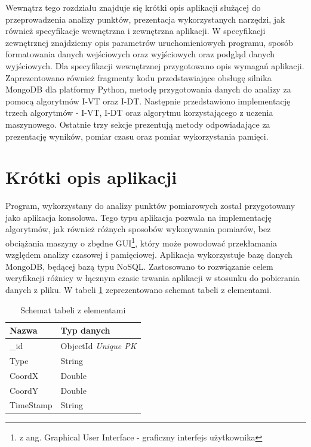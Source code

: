 Wewnątrz tego rozdziału znajduje się krótki opis aplikacji służącej do przeprowadzenia analizy punktów, prezentacja wykorzystanych narzędzi, jak również specyfikacje wewnętrzna i zewnętrzna aplikacji. W specyfikacji zewnętrznej znajdziemy opis parametrów uruchomieniowych programu, sposób formatowania danych wejściowych oraz wyjściowych oraz podgląd danych wyjściowych. Dla specyfikacji wewnętrznej przygotowano opis wymagań aplikacji. Zaprezentowano również fragmenty kodu przedstawiające obsługę silnika MongoDB dla platformy Python, metodę przygotowania danych do analizy za pomocą algorytmów I-VT oraz I-DT. Następnie przedstawiono implementację trzech algorytmów - I-VT, I-DT oraz algorytmu korzystającego z uczenia maszynowego. Ostatnie trzy sekcje prezentują metody odpowiadające za prezentację wyników, pomiar czasu oraz pomiar wykorzystania pamięci. 
\section{Krótki opis aplikacji}
\label{sec:shortdesc}
Program, wykorzystany do analizy punktów pomiarowych został przygotowany jako aplikacja konsolowa. Tego typu aplikacja pozwala na implementację algorytmów, jak również różnych sposobów wykonywania pomiarów, bez obciążania maszyny o zbędne GUI\footnote{z ang. Graphical User Interface - graficzny interfejs użytkownika}, który może powodować przekłamania względem analizy czasowej i pamięciowej. Aplikacja wykorzystuje bazę danych MongoDB, będącej bazą typu NoSQL. Zastosowano to rozwiązanie celem weryfikacji różnicy w łącznym czasie trwania aplikacji w stosunku do pobierania danych z pliku. W tabeli \ref{tab:nosqlschema} zeprezentowano schemat tabeli z elementami.
\begin{table}[H]
    \centering
    \begin{tabular}{|l|l|}
    \hline
    \textbf{Nazwa} & \textbf{Typ danych} \\ \hline
    \_id           & ObjectId \textit{Unique PK} \\ \hline
    Type           & String              \\ \hline
    CoordX         & Double              \\ \hline
    CoordY         & Double              \\ \hline
    TimeStamp      & String              \\ \hline
    \end{tabular}
    \caption{Schemat tabeli z elementami}
    \label{tab:nosqlschema}
\end{table}
